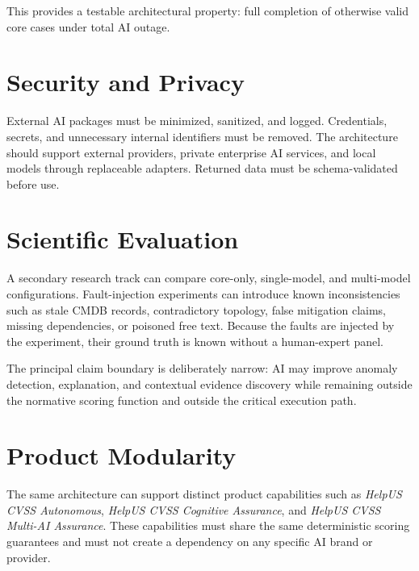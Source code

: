 This provides a testable architectural property: full completion of otherwise valid core cases under total AI outage.

\section{Security and Privacy}

External AI packages must be minimized, sanitized, and logged. Credentials, secrets, and unnecessary internal identifiers must be removed. The architecture should support external providers, private enterprise AI services, and local models through replaceable adapters. Returned data must be schema-validated before use.

\section{Scientific Evaluation}

A secondary research track can compare core-only, single-model, and multi-model configurations. Fault-injection experiments can introduce known inconsistencies such as stale CMDB records, contradictory topology, false mitigation claims, missing dependencies, or poisoned free text. Because the faults are injected by the experiment, their ground truth is known without a human-expert panel.

The principal claim boundary is deliberately narrow: AI may improve anomaly detection, explanation, and contextual evidence discovery while remaining outside the normative scoring function and outside the critical execution path.

\section{Product Modularity}

The same architecture can support distinct product capabilities such as \emph{HelpUS CVSS Autonomous}, \emph{HelpUS CVSS Cognitive Assurance}, and \emph{HelpUS CVSS Multi-AI Assurance}. These capabilities must share the same deterministic scoring guarantees and must not create a dependency on any specific AI brand or provider.
